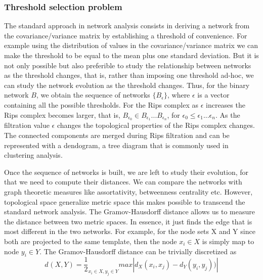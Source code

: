 \documentclass[onecollarge,runningheads]{svjour2}
\begin{document}
\subsubsection{Threshold selection problem}
\label{sse:thr}

The standard approach in network analysis consists in deriving a network from the covariance/variance matrix by establishing a threshold of convenience. For example using the distribution of values in the covariance/variance matrix we can make the threshold to be equal to the mean plus one  standard deviation. But it is not only possible but also preferible to study the relationship between networks as the threshold changes, that is, rather than imposing one threshold ad-hoc, we can study the network evolution as the threshold changes. Thus, for the binary network $B$, we obtain the sequence of networks $\{B_{\epsilon}\}$, where $\epsilon$ is a vector containing all the possible thresholds. For the Rips complex as $\epsilon$ increases the Rips complex becomes larger, that is, $B_{\epsilon_0} \in B_{\epsilon_1} ... B_{\epsilon_n}$, for $\epsilon_0 \leq \epsilon_1 ...\epsilon_n$. As the filtration value $\epsilon$ changes the topological properties of the Rips complex changes.
The connected components are merged during Rips filtration and can be represented with a dendogram, a tree diagram that is commonly used in clustering analysis.

Once the sequence of networks is built, we are left to study their evolution, for that we need to compute their distances. We can compare the networks with graph theoretic measures like assortativity, betweenness centrality etc. However, topological space generalize metric space this makes possible to transcend the standard network analysis.
The Gramov-Hausdorff distance allows us to measure the distance between two metric spaces. In essence, it just finds the edge that is most different in the two networks. For example, for the node sets X and Y since both are projected to the same template, then the node $x_i \in X$ is simply map to node $y_i \in Y$. The Gramov-Hausdorff distance can be trivially discretized as
\begin{equation}
d_{}(X,Y) = \frac{1}{2}_{x_i \in X, y_j \in Y} max |d_X(x_i,x_j) - d_Y(y_i,y_j))|
\end{equation}
\end{document}
